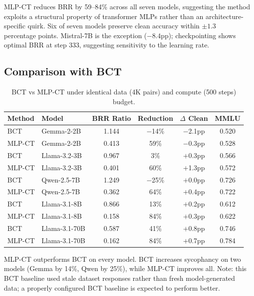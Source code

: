 \documentclass[12pt, letterpaper]{article}
\begin{document}
MLP-CT reduces BRR by 59--84\% across all seven models, suggesting the method exploits a structural property of transformer MLPs rather than an architecture-specific quirk. Six of seven models preserve clean accuracy within $\pm 1.3$ percentage points. Mistral-7B is the exception ($-8.4$pp); checkpointing shows optimal BRR at step 333, suggesting sensitivity to the learning rate.

\subsection{Comparison with BCT}

\begin{table}[h]
\centering
\small
\caption{BCT vs MLP-CT under identical data (4K pairs) and compute (500 steps) budget.}
\label{tab:bct_comparison}
\begin{tabular}{llcccc}
\toprule
\textbf{Method} & \textbf{Model} & \textbf{BRR Ratio} & \textbf{Reduction} & \textbf{$\Delta$ Clean} & \textbf{MMLU} \\
\midrule
BCT & Gemma-2-2B & \cellcolor{red!15}1.144 & \cellcolor{red!15}$-$14\% & $-$2.1pp & 0.520 \\
\rowcolor{mlpcthl} MLP-CT & Gemma-2-2B & 0.413 & 59\% & $-$0.3pp & 0.528 \\
\midrule
BCT & Llama-3.2-3B & 0.967 & 3\% & $+$0.3pp & 0.566 \\
\rowcolor{mlpcthl} MLP-CT & Llama-3.2-3B & 0.401 & 60\% & $+$1.3pp & 0.572 \\
\midrule
BCT & Qwen-2.5-7B & \cellcolor{red!15}1.249 & \cellcolor{red!15}$-$25\% & $+$0.0pp & 0.726 \\
\rowcolor{mlpcthl} MLP-CT & Qwen-2.5-7B & 0.362 & 64\% & $+$0.4pp & 0.722 \\
\midrule
BCT & Llama-3.1-8B & 0.866 & 13\% & $+$0.2pp & 0.612 \\
\rowcolor{mlpcthl} MLP-CT & Llama-3.1-8B & 0.158 & 84\% & $+$0.3pp & 0.622 \\
\midrule
BCT & Llama-3.1-70B & 0.587 & 41\% & $+$0.8pp & 0.746 \\
\rowcolor{mlpcthl} MLP-CT & Llama-3.1-70B & 0.162 & 84\% & $+$0.7pp & 0.784 \\
\bottomrule
\end{tabular}
\end{table}

MLP-CT outperforms BCT on every model. BCT increases sycophancy on two models (Gemma by 14\%, Qwen by 25\%), while MLP-CT improves all. Note: this BCT baseline used stale dataset responses rather than fresh model-generated data; a properly configured BCT baseline is expected to perform better.
\end{document}
